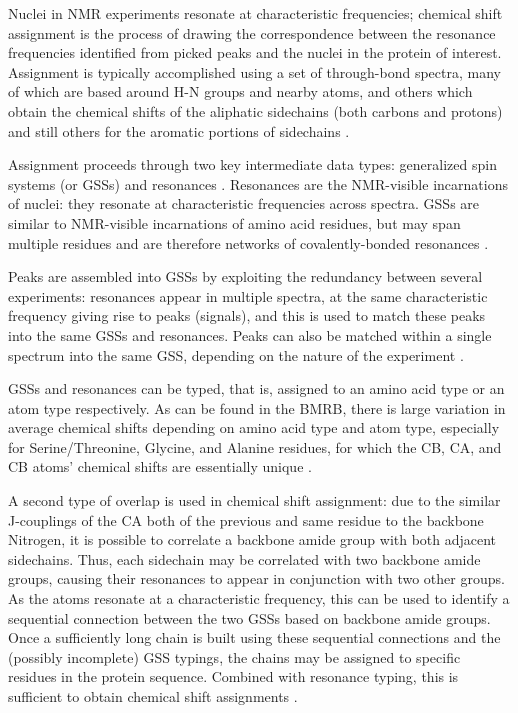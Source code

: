 Nuclei in NMR experiments resonate at characteristic frequencies; 
chemical shift assignment is the process of drawing the correspondence between
the resonance frequencies identified from picked peaks and the nuclei in the
protein of interest.  Assignment is typically accomplished using a set of
through-bond spectra, many of which are based around H-N groups and nearby
atoms, and others which obtain the chemical shifts of the aliphatic sidechains
(both carbons and protons) and still others for the aromatic portions of
sidechains \cite{hnco, hncacb, cbcaconh, hbhaconh, cconhtocsy}.

Assignment proceeds through two key intermediate data types: generalized spin
systems (or GSSs) and resonances \cite{bmrb, ccpn}.  
Resonances are the NMR-visible incarnations
of nuclei: they resonate at characteristic frequencies across spectra.  GSSs
are similar to NMR-visible incarnations of amino acid residues, but may span
multiple residues and are therefore networks of covalently-bonded resonances
\cite{abacus_assignment}.

Peaks are assembled into GSSs by exploiting the redundancy between several 
experiments: resonances appear in multiple spectra, at the same characteristic
frequency giving rise to peaks (signals), and this is used to match these
peaks into the same GSSs and resonances.  Peaks can also be matched within
a single spectrum into the same GSS, depending on the nature of the experiment
\cite{ccpn}.

GSSs and resonances can be typed, that is, assigned to an amino acid type or
an atom type respectively.  As can be found in the BMRB, there is large 
variation in average chemical shifts depending on amino acid type and atom type,
especially for Serine/Threonine, Glycine, and Alanine residues, for which the
CB, CA, and CB atoms' chemical shifts are essentially unique
\cite{guntert2009automated}.

A second type of overlap is used in chemical shift assignment: due to the 
similar J-couplings of the CA both of the previous and same residue to the
backbone Nitrogen, it is possible to correlate a backbone amide group with
both adjacent sidechains.  Thus, each sidechain may be correlated with two
backbone amide groups, causing their resonances to appear in conjunction with
two other groups.  As the atoms resonate at a characteristic frequency, this
can be used to identify a sequential connection between the two GSSs based on
backbone amide groups.  Once a sufficiently long chain is built using these
sequential connections and the (possibly incomplete) GSS typings, the chains 
may be assigned to specific residues in the protein sequence.  Combined with
resonance typing, this is sufficient to obtain chemical shift assignments
\cite{hnco, hncacb, cbcaconh}.

